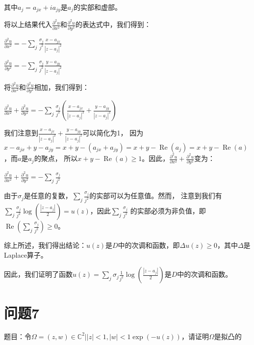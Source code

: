 \documentclass[12pt, a4paper, oneside]{ctexart}
\begin{document}
\begin{spacing}{2.0}
\begin{center}
\end{center}
其中$\displaystyle a_j = a_{jx}+ia_{jy}$是$a_j$的实部和虚部。

将以上结果代入$\displaystyle \frac{\partial^2 u}{\partial x^2}$和$\displaystyle \frac{\partial^2 u}{\partial y^2}$的表达式中，我们得到：
\begin{center}
    $\displaystyle \frac{\partial^2u}{\partial x^2} = -\sum_j\frac{\sigma_j}{j^2}\frac{x-a_{jx}}{|z-a_j|^2}$
\end{center}

\begin{center}
    $\displaystyle \frac{\partial^2u}{\partial y^2} = -\sum_j\frac{\sigma_j}{j^2}\frac{y-a_{jy}}{|z-a_j|^2}$
\end{center}
将$\displaystyle \frac{\partial^2 u}{\partial x^2}$和$\displaystyle \frac{\partial^2 u}{\partial y^2}$相加，我们得到：

\begin{center}
    $\displaystyle \frac{\partial^2u}{\partial x^2}+\frac{\partial^2u}{\partial y^2}=-\sum_j\frac{\sigma_j}{j^2}\left(\frac{x-a_{jx}}{|z-a_j|^2}+\frac{y-a_{jy}}{|z-a_j|^2}\right)$
\end{center}

我们注意到$\displaystyle \frac{x-a_{jx}}{|z-a_j|^2} + \frac{y-a_{jy}}{|z-a_j|^2}$可以简化为1，
因为$\displaystyle x-a_{jx}+y-a_{jy}=x+y-(a_{jx}+a_{jy})=x+y-\operatorname{Re}(a_j)=x+y-\operatorname{Re}(a)$，而$a$是$a_j$的聚点，
所以$\displaystyle x+y-\operatorname{Re}(a) \geq 1$。因此，$\displaystyle \frac{\partial^2 u}{\partial x^2} + \frac{\partial^2 u}{\partial y^2}$变为：

\begin{center}
    $\displaystyle \frac{\partial^2u}{\partial x^2}+\frac{\partial^2u}{\partial y^2}=-\sum_j\frac{\sigma_j}{j^2}$
\end{center}
由于$\sigma_j$是任意的复数，$\sum_{j}\frac{\sigma_j}{j^2}$的实部可以为任意值。然而，
注意到我们有$\displaystyle \sum_{j}\frac{\sigma_j}{j^2}\log\left(\frac{|z-a_j|}{2}\right) = u(z)$，因此$\displaystyle \sum_{j}\frac{\sigma_j}{j^2}$
的实部必须为非负值，即$\displaystyle \operatorname{Re}\left(\sum_{j}\frac{\sigma_j}{j^2}\right) \geq 0$。

综上所述，我们得出结论：$u(z)$是$D$中的次调和函数，即$\Delta u(z) \geq 0$，其中$\Delta$是Laplace算子。

因此，我们证明了函数$\displaystyle u(z) = \sum_{j}\sigma_j \frac{1}{j^2}\log\left(\frac{|z-a_j|}{2}\right)$是$D$中的次调和函数。
\section{问题7}
题目：令$\displaystyle \Omega = {(z, w) \in \mathbb{C}^2||z|<1, |w|<1\exp(-u(z))}$，请证明$\Omega$是拟凸的\\


\end{spacing}
\end{document}

